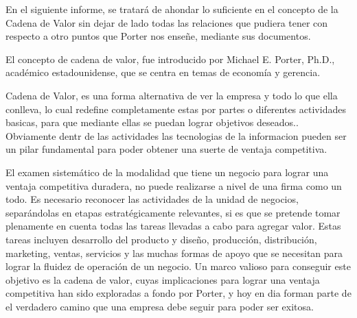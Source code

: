 En el siguiente informe, se tratará de ahondar lo suficiente en el concepto de
la Cadena de Valor sin dejar de lado todas las relaciones que pudiera tener
con respecto a otro puntos que Porter nos enseñe, mediante sus documentos.

El concepto de cadena de valor, fue introducido por Michael E. Porter, Ph.D.,
académico estadounidense, que se centra en temas de economía y gerencia.

Cadena de Valor, es una forma alternativa de ver la empresa y todo lo que ella
conlleva, lo cual redefine completamente estas por partes o diferentes actividades
basicas, para que mediante ellas se puedan lograr objetivos deseados.. Obviamente
dentr de las actividades las tecnologias de la informacion pueden ser un pilar
fundamental para poder obtener una suerte de ventaja competitiva.

El examen sistemático de la modalidad que tiene un negocio para lograr una ventaja
competitiva duradera, no puede realizarse a nivel de una firma como un todo.
Es necesario reconocer las actividades de la unidad de negocios, separándolas
en etapas estratégicamente relevantes, si es que se pretende tomar plenamente
en cuenta todas las tareas llevadas a cabo para agregar valor. Estas tareas
incluyen desarrollo del producto y diseño, producción, distribución, marketing,
ventas, servicios y las muchas formas de apoyo que se necesitan para lograr la
fluidez de operación de un negocio. Un marco valioso para conseguir este objetivo
es la cadena de valor, cuyas implicaciones para lograr una ventaja competitiva han
sido exploradas a fondo por Porter, y hoy en dia forman parte de el verdadero camino
que una empresa debe seguir para poder ser exitosa.

\newpage
